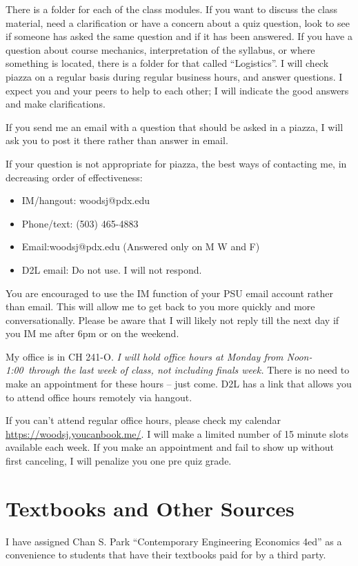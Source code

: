 \documentclass[letterpaper,10pt]{article}
\newcommand{\Office}{at Monday from Noon-1:00}
\begin{document}
There is a folder for each of the class modules. If you want to discuss the class material, need a clarification or have a concern about a quiz question, look to see if someone has asked the same question and if it has been answered.  If you have a question about course mechanics, interpretation of the syllabus, or where something is located, there is a folder for that called ``Logistics''. I will check piazza on a regular basis during regular business hours, and answer questions. I expect you and your peers to help to each other; I will indicate the good answers and make clarifications.  

If you send me an email with a question that should be asked in a piazza, I
will ask you to post it there rather than answer in email.

If your question is not appropriate for piazza, the best ways of contacting me, in
decreasing order of effectiveness:
\begin{itemize}
\item IM/hangout: woodsj@pdx.edu
\item Phone/text: (503) 465-4883
\item Email:woodsj@pdx.edu (Answered only on M W and F)
\item D2L email: Do not use.  I will not respond.
\end{itemize}

You are encouraged to use the IM function of your PSU email account rather than email. This will allow me to get back to you more quickly and more conversationally. Please be aware that I will likely not reply till the next day if you IM me after 6pm or on the weekend.  

My office is in CH 241-O.  \emph{I will hold office hours \Office ~through the last week of class, not including finals week.} There is no need to make an appointment for these hours -- just come.  D2L has a link that allows you to attend office hours remotely via hangout.

If you can’t attend regular office hours, please check my calendar \url{https://woodsj.youcanbook.me/}. I will make a limited number of 15 minute slots available each week. If you make an appointment and fail to show up without first canceling, I will penalize you one pre quiz grade.  


 
\section{Textbooks and Other Sources}
I have assigned Chan S. Park ``Contemporary Engineering Economics
4ed'' as a convenience to students that have their textbooks paid for by a third party. 
\end{document}
